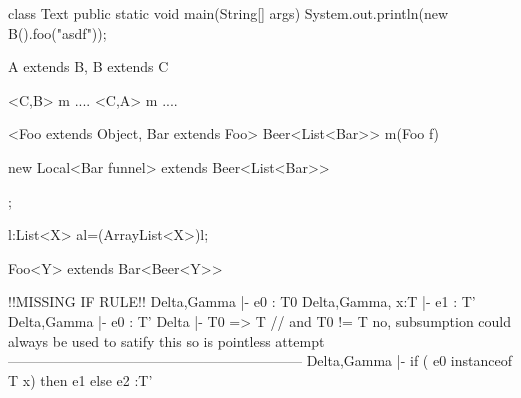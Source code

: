 class Text {
    public static void main(String[] args) {
        System.out.println(new B().foo("asdf"));
    }
}

A extends B, B extends C

<C,B> m ....
<C,A> m ....

<Foo extends Object, Bar extends Foo> Beer<List<Bar>> m(Foo f){
  new Local<Bar funnel> extends Beer<List<Bar>>{
    
  };  
}


l:List<X>
al=(ArrayList<X>)l;

Foo<Y> extends Bar<Beer<Y>>{}

!!MISSING IF RULE!!
  Delta,Gamma      |- e0 : T0
  Delta,Gamma, x:T |- e1 : T'
  Delta,Gamma      |- e0 : T'
  Delta |- T0 => T   // and T0 != T no, subsumption could always be used to satify this so is pointless attempt
---------------------------------------------------------------
  Delta,Gamma |-  if ( e0 instanceof T x) then e1 else e2 :T'